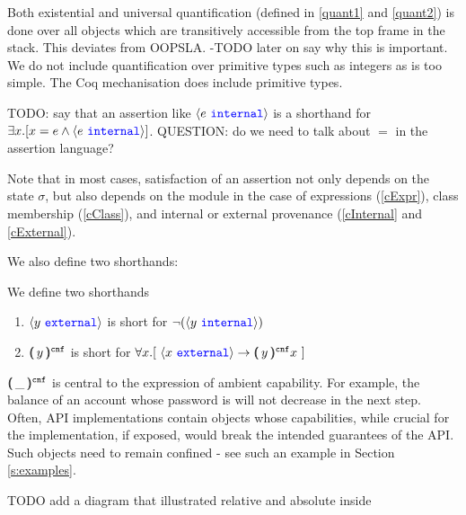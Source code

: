 Both existential and universal quantification (defined in \ref{quant1} and \ref{quant2}) is done over all objects which are transitively 
accessible from the top frame in the stack. This deviates from OOPSLA. -TODO later on say why this is important.
We do not include quantification over primitive types such as integers as \Loo is too simple. The 
Coq mechanisation does include primitive types.
 
TODO: say that an assertion like ${\langle e\ {\color{blue}\texttt{internal}}\rangle}$ is a shorthand for $\exists x. [ x=e \wedge {\langle e\ {\color{blue}\texttt{internal}}\rangle}]$. QUESTION: do we need to talk about $=$ in the assertion language?

 Note that in most cases, satisfaction of an assertion not only depends on the state $\sigma$, but 
also depends on the module in the case of expressions (\ref{cExpr}), class membership
(\ref{cClass}), and internal or external provenance (\ref{cInternal} and \ref{cExternal}).

We also define two shorthands:

\begin{definition}
We define two shorthands

\begin{enumerate}
\item
$\langle y\ {\color{blue}\texttt{external}}\rangle$ is short for  $\neg(\langle y\ {\color{blue}\texttt{internal}}\rangle)$
\item
${ (\!\!( \, y \, )\!\!)^{{\texttt{cnf}}} }$  is short for ${\forall x.[\ \langle x\ {\color{blue}\texttt{external}}\rangle  \rightarrow  {}{\ensuremath{(\!\!(\, y\, )\!\!)^{{\texttt{cnf}}} x}}\ ]}$
\end{enumerate}
\end{definition}

${ (\!\!( \, \_ \, )\!\!)^{{\texttt{cnf}}} }$  is central to the expression of ambient capability. For example, the balance of an account whose
  password is \inside  will not decrease in the next step.
  Often, API implementations contain objects whose capabilities, while  crucial for the implementation, if exposed,
would break the intended guarantees of the API. Such objects need to remain confined - see
such an example in Section \ref{s:examples}. 
 
 TODO add a diagram that illustrated relative and absolute inside


